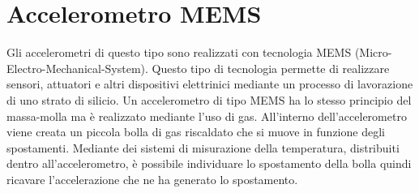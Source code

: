 \section{Accelerometro MEMS}
Gli accelerometri di questo tipo sono realizzati con tecnologia MEMS
(Micro-Electro-Mechanical-System). Questo tipo di tecnologia permette
di realizzare sensori, attuatori e altri dispositivi elettrinici
mediante un processo di lavorazione di uno strato di silicio.
Un accelerometro di tipo MEMS ha lo stesso principio del massa-molla
ma è realizzato mediante l'uso di gas. All'interno dell'accelerometro
viene creata un piccola bolla di gas riscaldato che si muove in
funzione degli spostamenti. Mediante dei sistemi di misurazione della
temperatura, distribuiti dentro all'accelerometro, è possibile
individuare lo spostamento della bolla quindi ricavare l'accelerazione
che ne ha generato lo spostamento.